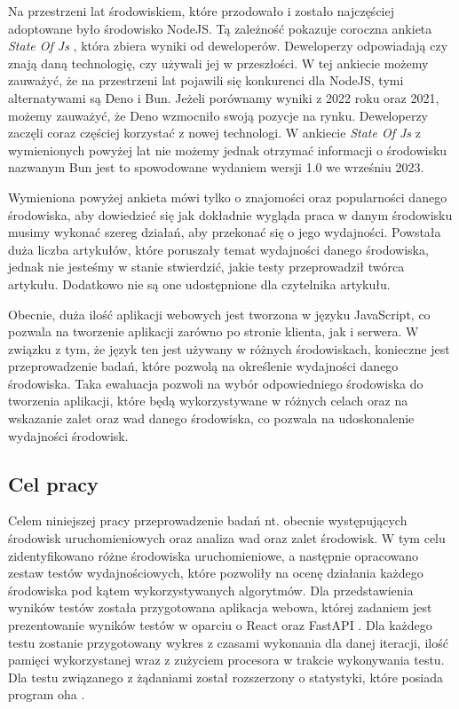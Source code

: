 Na przestrzeni lat środowiskiem, które przodowało i zostało najczęściej adoptowane było środowisko NodeJS. Tą zależność pokazuje coroczna ankieta \textit{State Of Js} \cite{State_of_js:2021} \cite{State_of_js:2022}, która zbiera wyniki od deweloperów. Deweloperzy odpowiadają czy znają daną technologię, czy używali jej w przeszłości. W tej ankiecie możemy zauważyć, że na przestrzeni lat pojawili się konkurenci dla NodeJS, tymi alternatywami są Deno i Bun. Jeżeli porównamy wyniki z 2022 roku oraz 2021, możemy zauważyć, że Deno wzmocniło swoją pozycje na rynku. Deweloperzy zaczęli coraz częściej korzystać z nowej technologi. W ankiecie \textit{State Of Js} \cite{State_of_js:2021} \cite{State_of_js:2022} z wymienionych powyżej lat nie możemy jednak otrzymać informacji o środowisku nazwanym Bun jest to spowodowane wydaniem wersji 1.0 we wrześniu 2023.

Wymieniona powyżej ankieta mówi tylko o znajomości oraz popularności danego środowiska, aby dowiedzieć się jak dokładnie wygląda praca w danym środowisku musimy wykonać szereg działań, aby przekonać się o jego wydajności. Powstała duża liczba artykułów, które poruszały temat wydajności danego środowiska, jednak nie jesteśmy w stanie stwierdzić, jakie testy przeprowadził twórca artykułu. Dodatkowo nie są one udostępnione dla czytelnika artykułu.

Obecnie, duża ilość aplikacji webowych jest tworzona w języku JavaScript, co pozwala na tworzenie aplikacji zarówno po stronie klienta, jak i serwera. W związku z tym, że język ten jest używany w różnych środowiskach, konieczne jest przeprowadzenie badań, które pozwolą na określenie wydajności danego środowiska. Taka ewaluacja pozwoli na wybór odpowiedniego środowiska do tworzenia aplikacji, które będą wykorzystywane w różnych celach oraz na wskazanie zalet oraz wad danego środowiska, co pozwala na udoskonalenie wydajności środowisk.  

\subsection*{Cel pracy}
Celem niniejszej pracy przeprowadzenie badań nt. obecnie występujących środowisk uruchomieniowych oraz analiza wad oraz zalet środowisk. W tym celu zidentyfikowano różne środowiska uruchomieniowe, a następnie opracowano zestaw testów wydajnościowych, które pozwoliły na ocenę działania każdego środowiska pod kątem wykorzystywanych algorytmów. Dla przedstawienia wyników testów  została przygotowana aplikacja webowa, której zadaniem jest prezentowanie wyników testów w oparciu o React \cite{React} oraz FastAPI \cite{FastAPI}. Dla każdego testu zostanie przygotowany wykres z czasami wykonania dla danej iteracji, ilość pamięci wykorzystanej wraz z zużyciem procesora w trakcie wykonywania testu. Dla testu związanego z żądaniami  został rozszerzony o statystyki, które posiada program oha \cite{oha}.

